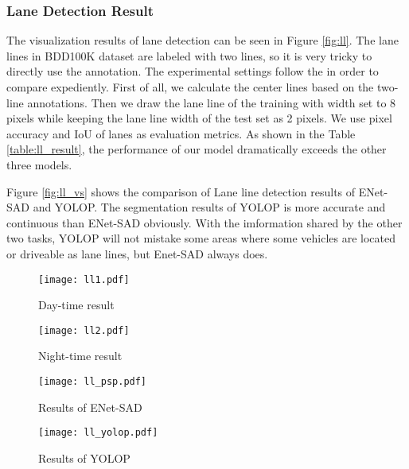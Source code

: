 \documentclass[10pt,twocolumn,letterpaper]{article}
\begin{document}
\subsubsection{Lane Detection Result}
The visualization results of lane detection can be seen in Figure \ref{fig:ll}. The lane lines in BDD100K dataset are labeled with two lines, so it is very tricky to directly use the annotation. The experimental settings follow the \cite{sad-enet} in order to compare expediently. First of all, we calculate the center lines based on the two-line annotations. Then we draw the lane line of the training with width set to 8 pixels while keeping the lane line width of the test set as 2 pixels. We use pixel accuracy and IoU of lanes as evaluation metrics. As shown in the Table \ref{table:ll_result}, the performance of our model dramatically exceeds the other three models.


Figure \ref{fig:ll_vs} shows the comparison of Lane line detection results of ENet-SAD and YOLOP. The segmentation results of YOLOP is more accurate and continuous than ENet-SAD obviously. With the imformation shared by the other two tasks, YOLOP will not mistake some areas where some vehicles are located or driveable as lane lines, but Enet-SAD always does.


\begin{figure*}
\centering
\begin{subfigure}{\linewidth}
  \texttt{[image: ll1.pdf]}
  \caption{Day-time result}
\end{subfigure}

\begin{subfigure}{\linewidth}
  \texttt{[image: ll2.pdf]}
  \caption{Night-time result}
\end{subfigure}
   \caption{Visualization of the lane detection results of YOLOP. Top Row: Lane detection results in day-time scenes. Bottom row: Lane detection results in night scenes.}
\label{fig:ll}
\end{figure*}

\begin{figure*}
\centering
\begin{subfigure}{\linewidth}
  \texttt{[image: ll\_psp.pdf]}
  \caption{Results of ENet-SAD}
\end{subfigure}

\begin{subfigure}{\linewidth}
  \texttt{[image: ll\_yolop.pdf]}
  \caption{Results of YOLOP}
\end{subfigure}
\caption{Comparison between the lane detection results of ENet-SAD and YOLOP. Top Row: Lane detection results of ENet-SAD. Bottom row: Lane detection results of YOLOP. The yellow ellipses are the false negative. The red  ellipses indicate the false positive.}
\label{fig:ll_vs}
\end{figure*}
\end{document}

